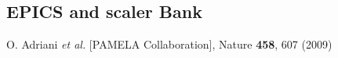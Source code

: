 \documentclass{desyproc}
\begin{document}
\subsection{EPICS and scaler Bank}








 

\begin{footnotesize}

\begin{thebibliography}{99}
O. Adriani {\it et al.} [PAMELA Collaboration], Nature {\bf 458}, 607 (2009) 


\end{thebibliography}


\end{footnotesize}
\end{document}
